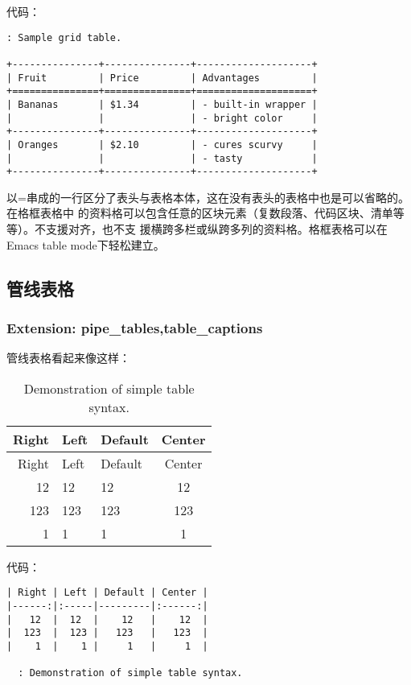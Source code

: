 \documentclass[cn]{elegantbook}
\begin{document}
代码：

\begin{lstlisting}
: Sample grid table.

+---------------+---------------+--------------------+
| Fruit         | Price         | Advantages         |
+===============+===============+====================+
| Bananas       | $1.34         | - built-in wrapper |
|               |               | - bright color     |
+---------------+---------------+--------------------+
| Oranges       | $2.10         | - cures scurvy     |
|               |               | - tasty            |
+---------------+---------------+--------------------+
\end{lstlisting}

以=串成的一行区分了表头与表格本体，这在没有表头的表格中也是可以省略的。在格框表格中
的资料格可以包含任意的区块元素（复数段落、代码区块、清单等等）。不支援对齐，也不支
援横跨多栏或纵跨多列的资料格。格框表格可以在Emacs table mode下轻松建立。

\hypertarget{ux7ba1ux7ebfux8868ux683c}{%
\subsection{管线表格}\label{ux7ba1ux7ebfux8868ux683c}}

\hypertarget{extension-pipe_tablestable_captions}{%
\subsubsection{Extension:
pipe\_tables,table\_captions}\label{extension-pipe_tablestable_captions}}

管线表格看起来像这样：

\begin{longtable}[]{@{}rllc@{}}
\caption{Demonstration of simple table syntax.}\tabularnewline
\toprule
Right & Left & Default & Center\tabularnewline
\midrule
\endfirsthead
\toprule
Right & Left & Default & Center\tabularnewline
\midrule
\endhead
12 & 12 & 12 & 12\tabularnewline
123 & 123 & 123 & 123\tabularnewline
1 & 1 & 1 & 1\tabularnewline
\bottomrule
\end{longtable}

代码：

\begin{lstlisting}
| Right | Left | Default | Center |
|------:|:-----|---------|:------:|
|   12  |  12  |    12   |    12  |
|  123  |  123 |   123   |   123  |
|    1  |    1 |     1   |     1  |

  : Demonstration of simple table syntax.
\end{lstlisting}
\end{document}
